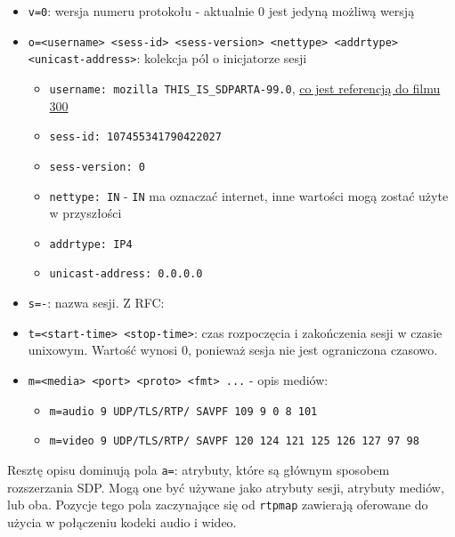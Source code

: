 \begin{itemize}
  \item \verb|v=0|: wersja numeru protokołu - aktualnie 0 jest jedyną możliwą wersją
  \item \verb|o=<username> <sess-id> <sess-version> <nettype> <addrtype> <unicast-address>|: kolekcja pól o inicjatorze
        sesji
        \begin{itemize}
          \item \verb|username: mozilla THIS_IS_SDPARTA-99.0|, \href{https://stackoverflow.com/a/52583935}{co jest referencją do filmu 300}
          \item \verb|sess-id: 107455341790422027|
          \item \verb|sess-version: 0|
          \item \verb|nettype: IN| - \verb|IN| ma oznaczać internet, inne wartości mogą zostać użyte w przyszłości
          \item \verb|addrtype: IP4|
          \item \verb|unicast-address: 0.0.0.0|
        \end{itemize}
  \item \verb|s=-|: nazwa sesji. Z RFC: \cite{rfc8866}
  \item \verb|t=<start-time> <stop-time>|: czas rozpoczęcia i zakończenia sesji w czasie unixowym. Wartość wynosi 0,
        ponieważ sesja nie jest ograniczona czasowo.
  \item \verb|m=<media> <port> <proto> <fmt> ...| - opis mediów:
        \begin{itemize}
          \item \verb|m=audio 9 UDP/TLS/RTP/ SAVPF 109 9 0 8 101|
          \item \verb|m=video 9 UDP/TLS/RTP/ SAVPF 120 124 121 125 126 127 97 98|
        \end{itemize}
\end{itemize}

Resztę opisu dominują pola \verb|a=|: atrybuty, które są głównym sposobem rozszerzania SDP. Mogą one być używane jako
atrybuty sesji, atrybuty mediów, lub oba. Pozycje tego pola zaczynające się od \verb|rtpmap| zawierają oferowane do
użycia w połączeniu kodeki audio i wideo.
